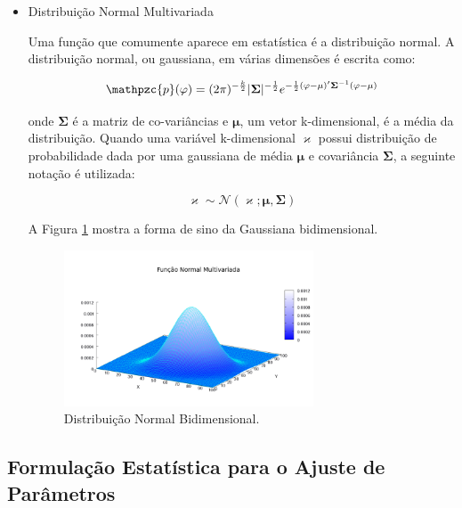 {\begin{itemize}
\item Distribuição Normal Multivariada

Uma função que comumente aparece em estatística é a distribuição normal. A distribuição normal, ou gaussiana, em várias dimensões é escrita como:

\begin{equation}
\mathpzc{p}(\mathbf{\varphi}) = (2\pi)^{-\frac{k}{2}} | \mathbf{\Sigma} | ^ {-\frac{1}{2}} e^{-\frac{1}{2}(\mathbf{\varphi} - \mathbf{\mu})'\mathbf{\Sigma}^{-1}(\mathbf{\varphi} - \mathbf{\mu})}
\end{equation}

onde $\mathbf{\Sigma}$ é a matriz de co-variâncias e $\mathbf{\mu}$, um vetor k-dimensional, é a média da distribuição. Quando uma variável k-dimensional $\mathbf{\varkappa}$ possui distribuição de probabilidade dada por uma gaussiana de média $\mathbf{\mu}$ e covariância $\mathbf{\Sigma}$, a seguinte notação é utilizada:

\begin{equation}
\mathbf{\varkappa} \sim \mathcal{N}(\mathbf{\varkappa}; \mathbf{\mu}, \mathbf{\Sigma})
\end{equation}

A Figura \ref{fig:normal} mostra a forma de sino da Gaussiana bidimensional.

\begin{figure}[!htbp]
\centering
\includegraphics[width=0.7\textwidth]{figs/multivariate.png}
\caption{Distribuição Normal Bidimensional.}
\label{fig:normal}
\end{figure}

\end{itemize}

\subsection{Formulação Estatística para o Ajuste de Parâmetros}
\label{ssec:tracking-parameter-fitting}

}
